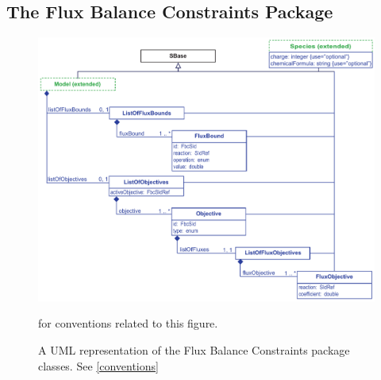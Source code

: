 \subsection{The Flux Balance Constraints Package}
\begin{figure}[h]
  \centering
  \includegraphics[width=\textwidth]{images/fbc_uml.pdf}\\
  \caption{A UML representation of the Flux Balance Constraints package classes. See \ref{conventions}} for conventions related to this figure. \label{fig:fbc_uml}
\end{figure}



